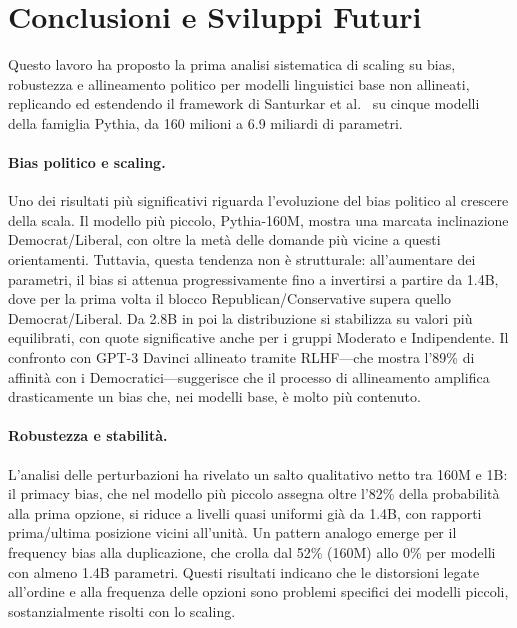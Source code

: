 \documentclass[../relazione.tex]{subfiles}
\begin{document}
\section{Conclusioni e Sviluppi Futuri}

Questo lavoro ha proposto la prima analisi sistematica di scaling su bias, robustezza e allineamento politico per modelli linguistici base non allineati, replicando ed estendendo il framework di Santurkar et al.\ \cite{santurkar2023whose} su cinque modelli della famiglia Pythia, da 160 milioni a 6.9 miliardi di parametri.

\paragraph{Bias politico e scaling.}
Uno dei risultati più significativi riguarda l'evoluzione del bias politico al crescere della scala. Il modello più piccolo, Pythia-160M, mostra una marcata inclinazione Democrat/Liberal, con oltre la metà delle domande più vicine a questi orientamenti. Tuttavia, questa tendenza non è strutturale: all'aumentare dei parametri, il bias si attenua progressivamente fino a invertirsi a partire da 1.4B, dove per la prima volta il blocco Republican/Conservative supera quello Democrat/Liberal. Da 2.8B in poi la distribuzione si stabilizza su valori più equilibrati, con quote significative anche per i gruppi Moderato e Indipendente. Il confronto con GPT-3 Davinci allineato tramite RLHF---che mostra l'89\% di affinità con i Democratici---suggerisce che il processo di allineamento amplifica drasticamente un bias che, nei modelli base, è molto più contenuto.

\paragraph{Robustezza e stabilità.}
L'analisi delle perturbazioni ha rivelato un salto qualitativo netto tra 160M e 1B: il primacy bias, che nel modello più piccolo assegna oltre l'82\% della probabilità alla prima opzione, si riduce a livelli quasi uniformi già da 1.4B, con rapporti prima/ultima posizione vicini all'unità. Un pattern analogo emerge per il frequency bias alla duplicazione, che crolla dal 52\% (160M) allo 0\% per modelli con almeno 1.4B parametri. Questi risultati indicano che le distorsioni legate all'ordine e alla frequenza delle opzioni sono problemi specifici dei modelli piccoli, sostanzialmente risolti con lo scaling.
\end{document}
